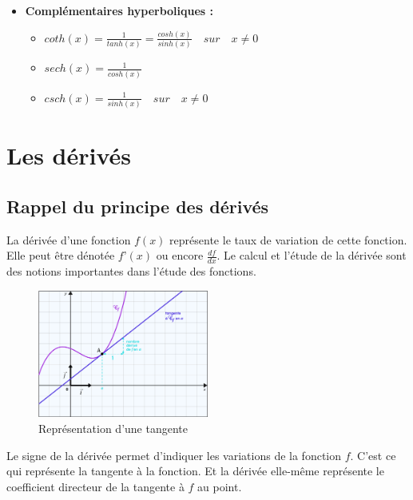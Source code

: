 \documentclass[12]{article}%
\theoremstyle{plain}
\theoremstyle{definition}
\theoremstyle{remark}
\begin{document}
\begin{itemize}
	\item \textbf{Complémentaires hyperboliques :}
	\begin{itemize}
		\item \( \boxed{coth(x) = \frac{1}{tanh(x)} = \frac{cosh(x)}{sinh(x)} } \quad sur \quad x \neq 0 \)
		\item \( \boxed{sech(x) = \frac{1}{cosh(x)}} \)
		\item \( \boxed{csch(x) = \frac{1}{sinh(x)}} \quad sur \quad x \neq 0 \)
	\end{itemize}
\end{itemize}



\newpage
\section{Les dérivés}
\subsection{Rappel du principe des dérivés}
La dérivée d’une fonction $f(x)$ représente le taux de variation de cette fonction. Elle peut être dénotée $f’(x)$ ou encore $\frac{df}{dx}$. Le calcul et l’étude de la dérivée sont des notions importantes dans l’étude des fonctions.

\begin{figure}[h] %
	\centering
	\includegraphics[width=0.5\textwidth]{./images/tangente.png} %
	\caption{Représentation d'une tangente}
	\label{fig:tangente} %
\end{figure}

Le signe de la dérivée permet d’indiquer les variations de la fonction $f$. C’est ce qui représente la tangente à la fonction. Et la dérivée elle-même représente le coefficient directeur de la tangente à $f$ au point. \newline
\end{document}
